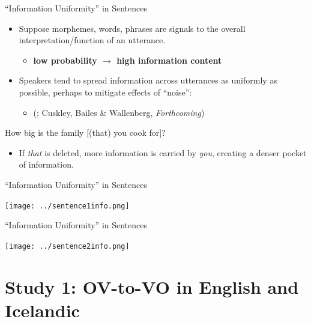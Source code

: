 \documentclass[hyperref={pdfpagelabels=false}]{beamer}
\begin{document}
\begin{frame}{``Information Uniformity'' in Sentences} 
\begin{itemize}
	\item Suppose morphemes, words, phrases are signals to the overall interpretation/function of an utterance.
	\begin{itemize} \item[] \textbf{low probability $\rightarrow$ high information content} \end{itemize}
	\item Speakers tend to spread information across utterances as uniformly as possible, perhaps to mitigate effects of ``noise'':\\ \begin{itemize}
		\item[] \footnotesize{(\citealt{fenkfenk1980,aylettturk2004,levyjaeger2007}; Cuskley, Bailes \& Wallenberg, \textsl{Forthcoming})}\nocite{cuskleyWallenberg2021}
	\end{itemize}
\end{itemize}
\begin{exe}
	\ex How big is the family $[$(that) you cook for$]$?
\end{exe}

\begin{itemize}
	\item If \textsl{that} is deleted, more information is carried by \textsl{you}, creating a denser pocket of information.
\end{itemize}


\end{frame}



\begin{frame}{``Information Uniformity'' in Sentences} 

\begin{center}
\texttt{[image: ../sentence1info.png]} 
\end{center}

\end{frame}

\begin{frame}{``Information Uniformity'' in Sentences} 

\begin{center}
	\texttt{[image: ../sentence2info.png]} 
\end{center}

\end{frame}


\section{Study 1: OV-to-VO in English and Icelandic}
\end{document}
